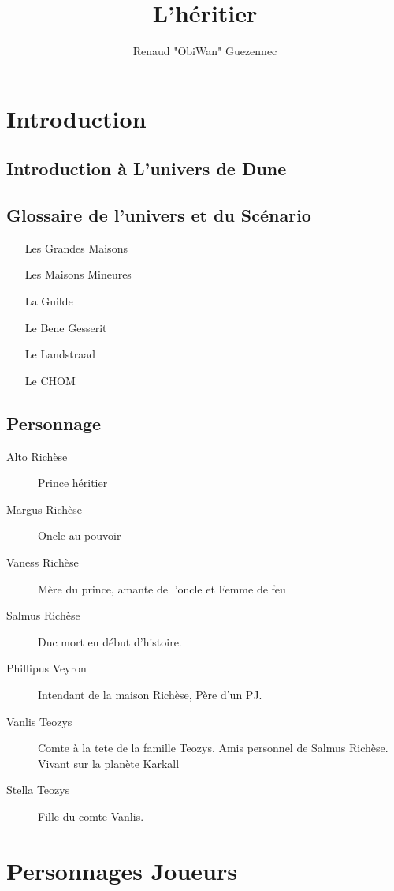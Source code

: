 \documentclass[oneside,12pt]{book}
\title{L'héritier}
\author{Renaud "ObiWan" Guezennec}
\date{}
\begin{document}
\maketitle \clearpage
\tableofcontents \clearpage

\begin{flushleft}
    \chapter{Introduction}
        \section{Introduction à L'univers de Dune}
         \section{Glossaire de l'univers et du Scénario}
\begin{itemize}
\item[Les Grandes Maisons]
\item[Les Maisons Mineures]
\item[La Guilde]
\item[Le Bene Gesserit]
\item[Le Landstraad]
\item[Le CHOM]
\end{itemize}

\section{Personnage}
\begin{description}
\item[Alto Richèse]{ Prince héritier}
\item[Margus Richèse]{  Oncle au pouvoir }
\item[Vaness Richèse]{  Mère du prince, amante de l'oncle et Femme de feu  }
\item[Salmus Richèse]{  Duc mort en début d'histoire.}
\item[Phillipus Veyron]{ Intendant de la maison Richèse, Père d'un PJ.}
\item[Vanlis Teozys] { Comte à la tete de la famille Teozys, Amis personnel de Salmus Richèse. Vivant sur la planète Karkall}
\item[Stella Teozys] {Fille du comte Vanlis.}
\end{description}
\chapter{Personnages Joueurs}
\clearpage

\end{flushleft}
\end{document}
